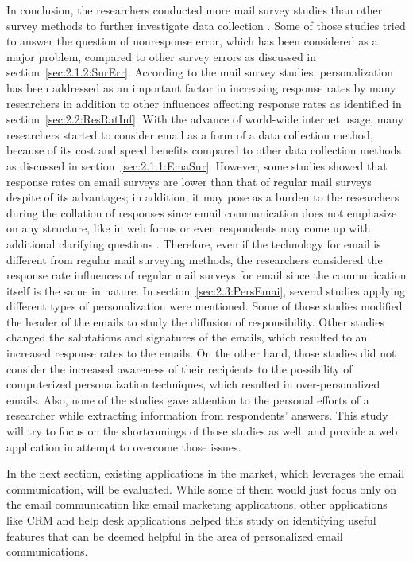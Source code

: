 In conclusion, the researchers conducted more mail survey studies than other survey methods to further investigate data collection \citep{Dillman1991}. Some of those studies tried to answer the question of nonresponse error, which has been considered as a major problem, compared to other survey errors as discussed in section~\ref{sec:2.1.2:SurErr}. According to the mail survey studies, personalization has been addressed as an important factor in increasing response rates by many researchers in addition to other influences affecting response rates as identified in section~\ref{sec:2.2:ResRatInf}. With the advance of world-wide internet usage, many researchers started to consider email as a form of a data collection method, because of its cost and speed benefits compared to other data collection methods as discussed in section~\ref{sec:2.1.1:EmaSur}. However, some studies showed that response rates on email surveys are lower than that of regular mail surveys despite of its advantages; in addition, it may pose as a burden to the researchers during the collation of responses since email communication does not emphasize on any structure, like in web forms or even respondents may come up with additional clarifying questions \citep{Selm2006}. Therefore, even if the technology for email is different from regular mail surveying methods, the researchers considered the response rate influences of regular mail surveys for email since the communication itself is the same in nature. In section~\ref{sec:2.3:PersEmai}, several studies applying different types of personalization were mentioned. Some of those studies modified the header of the emails to study the diffusion of responsibility. Other studies changed the salutations and signatures of the emails, which resulted to an increased response rates to the emails. On the other hand, those studies did not consider the increased awareness of their recipients to the possibility of computerized personalization techniques, which resulted in over-personalized emails. Also, none of the studies gave attention to the personal efforts of a researcher while extracting information from respondents' answers. This study will try to focus on the shortcomings of those studies as well, and provide a web application in attempt to overcome those issues.
\vspace{1cm}

In the next section, existing applications in the market, which leverages the email communication, will be evaluated. While some of them would just focus only on the email communication like email marketing applications, other applications like \ac{CRM} and help desk applications helped this study on identifying useful features that can be deemed helpful in the area of personalized email communications.


